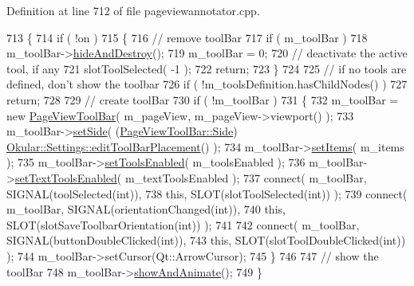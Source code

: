 Definition at line 712 of file pageviewannotator.\+cpp.


\begin{DoxyCode}
713 \{
714     \textcolor{keywordflow}{if} ( !on )
715     \{
716         \textcolor{comment}{// remove toolBar}
717         \textcolor{keywordflow}{if} ( m\_toolBar )
718             m\_toolBar->\hyperlink{classPageViewToolBar_a4dcd221e17f4413bf483c8429219a8b1}{hideAndDestroy}();
719         m\_toolBar = 0;
720         \textcolor{comment}{// deactivate the active tool, if any}
721         slotToolSelected( -1 );
722         \textcolor{keywordflow}{return};
723     \}
724 
725     \textcolor{comment}{// if no tools are defined, don't show the toolbar}
726     \textcolor{keywordflow}{if} ( !m\_toolsDefinition.hasChildNodes() )
727         \textcolor{keywordflow}{return};
728 
729     \textcolor{comment}{// create toolBar}
730     \textcolor{keywordflow}{if} ( !m\_toolBar )
731     \{
732         m\_toolBar = \textcolor{keyword}{new} \hyperlink{classPageViewToolBar}{PageViewToolBar}( m\_pageView, m\_pageView->viewport() );
733         m\_toolBar->\hyperlink{classPageViewToolBar_a9f6bb3c8fae4e3b4223c7c6408cfc8d8}{setSide}( (\hyperlink{classPageViewToolBar_a6410ac0bc9e35fba1314cfd6d7049385}{PageViewToolBar::Side})
      \hyperlink{classOkular_1_1Settings_ac46060432d448d647a00ef303afbf85c}{Okular::Settings::editToolBarPlacement}() );
734         m\_toolBar->\hyperlink{classPageViewToolBar_a3ba0856b9d3d0e080d674c80a754d902}{setItems}( m\_items );
735         m\_toolBar->\hyperlink{classPageViewToolBar_a99a0d8cd773f42adfa5420cbd4fa9535}{setToolsEnabled}( m\_toolsEnabled );
736         m\_toolBar->\hyperlink{classPageViewToolBar_a028996f58918fec0dc4499105a4976c2}{setTextToolsEnabled}( m\_textToolsEnabled );
737         connect( m\_toolBar, SIGNAL(toolSelected(\textcolor{keywordtype}{int})),
738                 \textcolor{keyword}{this}, SLOT(slotToolSelected(\textcolor{keywordtype}{int})) );
739         connect( m\_toolBar, SIGNAL(orientationChanged(\textcolor{keywordtype}{int})),
740                 \textcolor{keyword}{this}, SLOT(slotSaveToolbarOrientation(\textcolor{keywordtype}{int})) );
741         
742         connect( m\_toolBar, SIGNAL(buttonDoubleClicked(\textcolor{keywordtype}{int})),
743                 \textcolor{keyword}{this}, SLOT(slotToolDoubleClicked(\textcolor{keywordtype}{int})) );
744         m\_toolBar->setCursor(Qt::ArrowCursor);
745     \}
746 
747     \textcolor{comment}{// show the toolBar}
748     m\_toolBar->\hyperlink{classPageViewToolBar_a4d401e75a2a30b1fd187697128c926cf}{showAndAnimate}();
749 \}
\end{DoxyCode}
